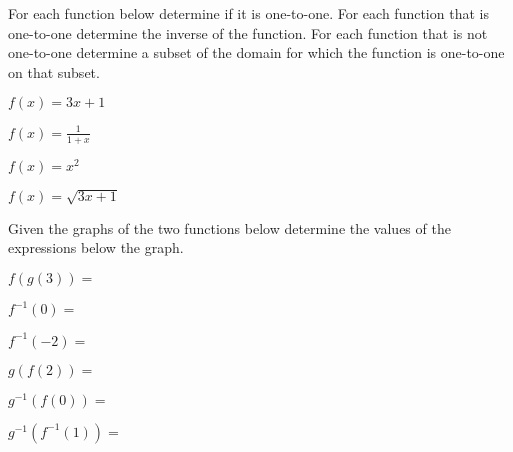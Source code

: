 \begin{problem}
\item For each function below determine if it is one-to-one. For each
  function that is one-to-one determine the inverse of the
  function. For each function that is not one-to-one determine a
  subset of the domain for which the function is one-to-one on that
  subset. 
  \begin{subproblem}
    \item $f(x)=3x+1$
      \vfill
    \item $f(x)=\frac{1}{1+x}$
      \vfill
    \item $f(x)=x^2$
      \vfill
    \item $f(x)=\sqrt{3x+1}$
      \vfill
  \end{subproblem}

  \clearpage

\item Given the graphs of the two functions below determine the values
  of the expressions below the graph.

  \hspace*{-6em}
  \scalebox{0.95}{}

  \begin{subproblem}
    \item $f(g(3)) =$
      \vfill
    \item $f^{-1}(0) =$
      \vfill
    \item $f^{-1}(-2) = $
      \vfill
    \item $g(f(2)) = $
      \vfill
    \item $g^{-1}(f(0)) = $
      \vfill
    \item $g^{-1}(f^{-1}(1)) = $
      \vfill
  \end{subproblem}

\end{problem}

\postClass

